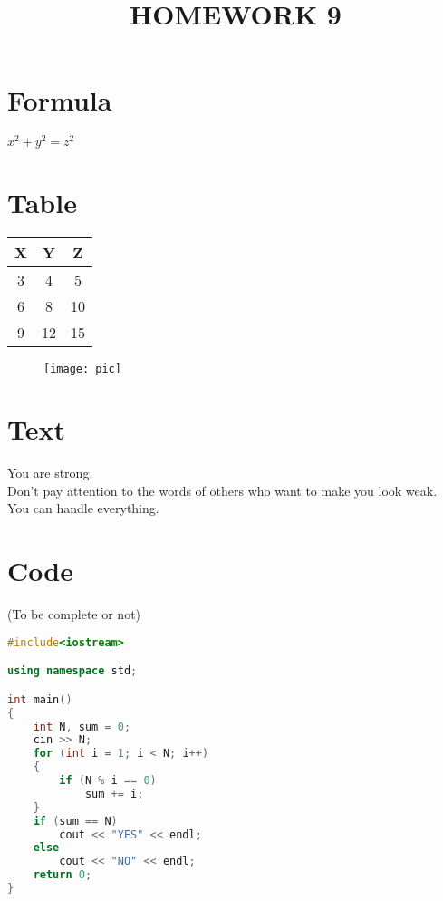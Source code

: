 \documentclass[12pt]{article}
\begin{document}
\title{HOMEWORK 9}
\maketitle

\section{Formula}
\(x^2 + y^2 = z^2\)

\section{Table}
\begin{table}[h]
    \begin{center}
     \begin{tabular}{|c|c|c|}
       \hline
       \textbf{X} & \textbf{Y} & \textbf{Z}\\
       \hline
       3 & 4 & 5 \\
       \hline
       6 & 8 & 10 \\
       \hline
       9 & 12 & 15 \\
       \hline
     \end{tabular}
     \end{center}
\end{table}

\begin{figure}
  \centering
  \texttt{[image: pic]}
\end{figure}

\section{Text}
You are strong.\\
Don't pay attention to the words of others who want to make you look weak.\\
You can handle everything.\\

\section{Code}
(To be complete or not)\\
\begin{lstlisting}[language=c++]
#include<iostream>

using namespace std;

int main()
{
	int N, sum = 0;
	cin >> N;
	for (int i = 1; i < N; i++)
	{
		if (N % i == 0)
			sum += i;
	}
	if (sum == N)
		cout << "YES" << endl;
	else
		cout << "NO" << endl;
	return 0;
}
\end{lstlisting}
\end{document}
